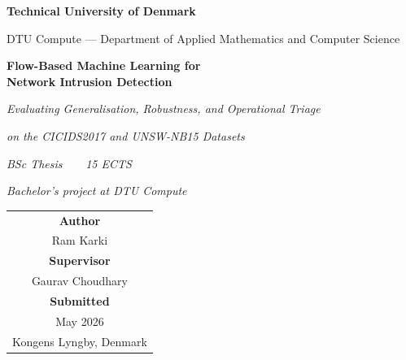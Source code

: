 \begin{titlepage}
\centering
\vspace*{2cm}
{\large\bfseries Technical University of Denmark\par}
\vspace{0.2em}
{\normalsize DTU Compute --- Department of Applied Mathematics and Computer Science\par}
\vspace{4cm}
{\Huge\bfseries\color{dtured} Flow-Based Machine Learning for\\[0.2em]
Network Intrusion Detection\par}
\vspace{1em}
{\large\itshape Evaluating Generalisation, Robustness, and Operational Triage\par}
{\large\itshape on the CICIDS2017 and UNSW-NB15 Datasets\par}
\vspace{2cm}
{\large\itshape BSc Thesis~~\textbar~~15 ECTS\par}
{\normalsize\itshape Bachelor's project at DTU Compute\par}
\vfill
\begin{tabular}{c}
  \textbf{Author}\\
  Ram Karki\\[1.2em]
  \textbf{Supervisor}\\
  Gaurav Choudhary\\[1.2em]
  \textbf{Submitted}\\
  May 2026\\[0.4em]
  Kongens Lyngby, Denmark
\end{tabular}
\vspace{2cm}
\end{titlepage}
